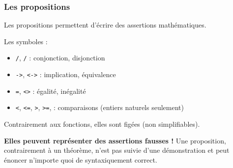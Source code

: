 \documentclass[9pt,handout]{beamer}
\newenvironment{warn}[1][Attention]{\begin{alertblock}{#1}}{\end{alertblock}}
\begin{document}
\newcommand{\bs}{\symbol{92}}
\begin{frame}
\frametitle{Les propositions}

Les propositions permettent d'écrire des assertions mathématiques.

\medskip
Les symboles :
\begin{itemize}
  \item \texttt{/\bs}, \texttt{\bs/} : conjonction, disjonction
  \item \texttt{->}, \texttt{<->} : implication, équivalence
  \item \texttt{=}, \texttt{<>} : égalité, inégalité
  \item \texttt{<}, \texttt{<=}, \texttt{>}, \texttt{>=}, : comparaisons (entiers naturels seulement)
\end{itemize}

\medskip
Contrairement aux fonctions, elles sont figées (non simplifiables).

\pause
\begin{warn}[]
\textbf{Elles peuvent représenter des assertions fausses !} Une proposition, contrairement à un théorème, n'est pas suivie d'une démonstration et peut énoncer n'importe quoi de syntaxiquement correct.
\end{warn}

\end{frame}
\end{document}
